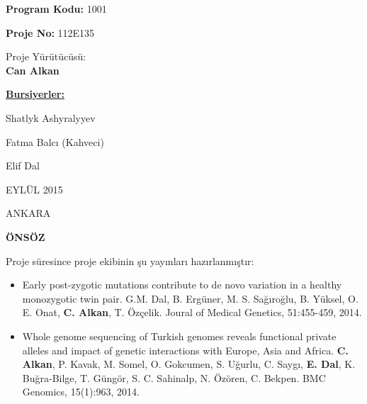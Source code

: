 \documentclass[11pt]{article}
\begin{document}
\bigskip

\bigskip


\thispagestyle{empty}


\begin{center}
\medskip
{\LARGE \textbf{Program Kodu:} 1001}

\bigskip
{\LARGE \textbf{Proje No:} 112E135}

\bigskip
{\LARGE Proje Yürütücüsü:\\
\textbf{Can Alkan}}

\end{center}



\bigskip


\bigskip
\noindent
{\Large
\noindent
\underline{\bf Bursiyerler:}

\noindent
Shatlyk Ashyralyyev

\noindent
Fatma Balcı (Kahveci)

\noindent
Elif Dal


}



\bigskip





\begin{center}
{\Large EYLÜL 2015

\vspace{1mm}
ANKARA}
\end{center}


\linespread{1.5}

\newpage\setlength{\parskip}{3mm} 
\onehalfspacing
\bigskip
\setcounter{page}{1}
\begin{center}
{\LARGE \bf ÖNSÖZ}
\end{center}


Proje süresince proje ekibinin şu yayınları hazırlanmıştır: 

\begin{itemize}
\item Early post-zygotic mutations contribute to de novo variation in a healthy monozygotic twin pair. G.M. Dal, B. Ergüner, M. S. Sağıroğlu, B. Yüksel, O. E. Onat, {\bf C. Alkan}, T. Özçelik. Joural of Medical Genetics, 51:455-459, 2014.
\item Whole genome sequencing of Turkish genomes reveals functional private alleles and impact of genetic interactions with Europe, Asia and Africa. {\bf C. Alkan}, P.  Kavak, M. Somel, O. Gokcumen, 
  S. Uğurlu, C. Saygı, {\bf E. Dal}, K. Buğra-Bilge,  T. Güngör, S. C. Sahinalp, N. Özören, C. Bekpen. BMC Genomics, 15(1):963, 2014.
\end{itemize}
\end{document}

